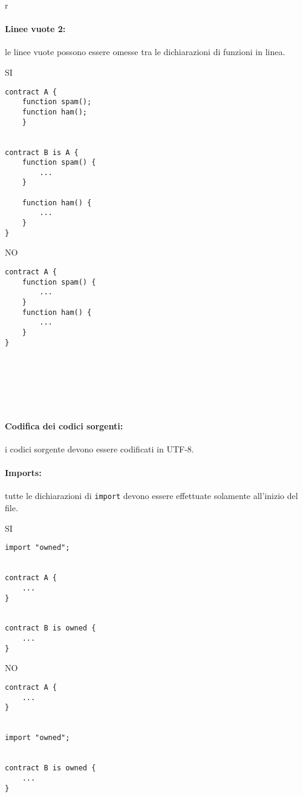 r\documentclass[../ProcessiPrimari.tex]{subfiles}
\begin{document}
\paragraph{Linee vuote 2: }
le linee vuote possono essere omesse tra le dichiarazioni di funzioni in linea.
\begin{center}{
\begin{minipage}{6cm}
{\begin{center}SI\end{center}}
\begin{Verbatim}[frame=single]
contract A {
    function spam();
    function ham();
    }


contract B is A {
    function spam() {
        ...
    }

    function ham() {
        ...
    }
}
\end{Verbatim}
\end{minipage}
\hfil
\begin{minipage}{6cm}
{\begin{center}NO\end{center}}
\begin{Verbatim}[frame=single]
contract A {
    function spam() {
        ...
    }
    function ham() {
        ...
    }
}







\end{Verbatim}
\end{minipage}
}
\end{center}

\paragraph*{Codifica dei codici sorgenti: }
i codici sorgente devono essere codificati in UTF-8.

\paragraph*{Imports: }
tutte le dichiarazioni di \texttt{import} devono essere effettuate solamente all'inizio del file.

\begin{center}{
\begin{minipage}{6cm}
{\begin{center}SI\end{center}}
\begin{Verbatim}[frame=single]
import "owned";


contract A {
    ...
}


contract B is owned {
    ...
}
\end{Verbatim}
\end{minipage}
\hfil
\begin{minipage}{6cm}
{\begin{center}NO\end{center}}
\begin{Verbatim}[frame=single]
contract A {
    ...
}


import "owned";


contract B is owned {
    ...
}
\end{Verbatim}
\end{minipage}
}
\end{center}
\end{document}

